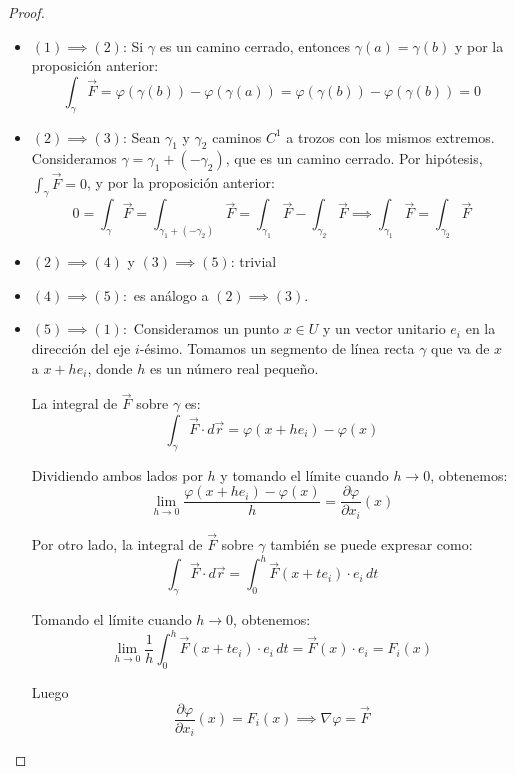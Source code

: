 \begin{proof}
    \leavevmode
\begin{itemize}
    \item $(1) \implies (2)$: Si $\gamma$ es un camino cerrado, entonces $\gamma(a) = \gamma(b)$ y por la proposición anterior:
          \[
              \int_{\gamma} \vec{F} = \varphi(\gamma(b)) - \varphi(\gamma(a)) = \varphi(\gamma(b)) - \varphi(\gamma(b)) = 0
          \]
    \item $(2) \implies (3)$: Sean $\gamma_1$ y $\gamma_2$ caminos $C^1$ a trozos con los mismos extremos. Consideramos $\gamma = \gamma_1 + (-\gamma_2)$, que es un camino cerrado. Por hipótesis, $\int_{\gamma} \vec{F} = 0$, y por la proposición anterior:
          \[
              0 = \int_{\gamma} \vec{F} = \int_{\gamma_1 + (-\gamma_2)} \vec{F} = \int_{\gamma_1} \vec{F} - \int_{\gamma_2} \vec{F} \implies \int_{\gamma_1} \vec{F} = \int_{\gamma_2} \vec{F}
          \]
    \item $(2) \implies (4)$ y $(3) \implies (5)$: trivial
    \item $(4) \implies (5):$ es análogo a $(2) \implies (3)$.
    \item $(5) \implies (1):$ Consideramos un punto \(x \in U\) y un vector unitario \(e_i\) en la dirección del eje \(i\)-ésimo. Tomamos un segmento de línea recta \(\gamma\) que va de \(x\) a \(x + h e_i\), donde \(h\) es un número real pequeño.

    La integral de \(\vec{F}\) sobre \(\gamma\) es:
    \[
    \int_{\gamma} \vec{F} \cdot d\vec{r} = \varphi(x + h e_i) - \varphi(x)
    \]
    
    Dividiendo ambos lados por \(h\) y tomando el límite cuando \(h \to 0\), obtenemos:
    \[
    \lim_{h \to 0} \frac{\varphi(x + h e_i) - \varphi(x)}{h} = \frac{\partial \varphi}{\partial x_i}(x)
    \]
    
    Por otro lado, la integral de \(\vec{F}\) sobre \(\gamma\) también se puede expresar como:
    \[
    \int_{\gamma} \vec{F} \cdot d\vec{r} = \int_{0}^{h} \vec{F}(x + t e_i) \cdot e_i \, dt
    \]
    
    Tomando el límite cuando \(h \to 0\), obtenemos:
    \[
    \lim_{h \to 0} \frac{1}{h} \int_{0}^{h} \vec{F}(x + t e_i) \cdot e_i \, dt = \vec{F}(x) \cdot e_i = F_i(x)
    \]
    
    Luego
    \[
    \frac{\partial \varphi}{\partial x_i}(x) = F_i(x) \implies \nabla \varphi = \vec{F}
    \]
\end{itemize}
\end{proof}

